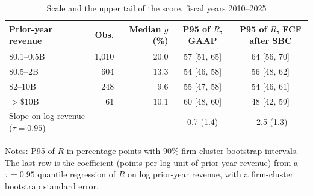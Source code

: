 \begin{table}[t]\centering\small
\caption{Scale and the upper tail of the score, fiscal years 2010--2025}\label{tab:scale}
\begin{tabular}{lrrcc}\toprule
Prior-year revenue & Obs. & Median $g$ (\%) & P95 of $R$, GAAP & P95 of $R$, FCF after SBC\\\midrule
\$0.1--0.5B & 1,010 & 20.0 & 57 [51, 65] & 64 [56, 70] \\
\$0.5--2B & 604 & 13.3 & 54 [46, 58] & 56 [48, 62] \\
\$2--10B & 248 & 9.6 & 55 [47, 58] & 54 [46, 61] \\
$>$\$10B & 61 & 10.1 & 60 [48, 60] & 48 [42, 59] \\
\midrule
Slope on log revenue ($\tau=0.95$) & & & 0.7 (1.4) & -2.5 (1.3) \\
\bottomrule\end{tabular}
\par\vspace{2pt}\footnotesize\raggedright Notes: P95 of $R$ in percentage points with 90\% firm-cluster bootstrap intervals. The last row is the coefficient (points per log unit of prior-year revenue) from a $\tau=0.95$ quantile regression of $R$ on log prior-year revenue, with a firm-cluster bootstrap standard error.
\end{table}